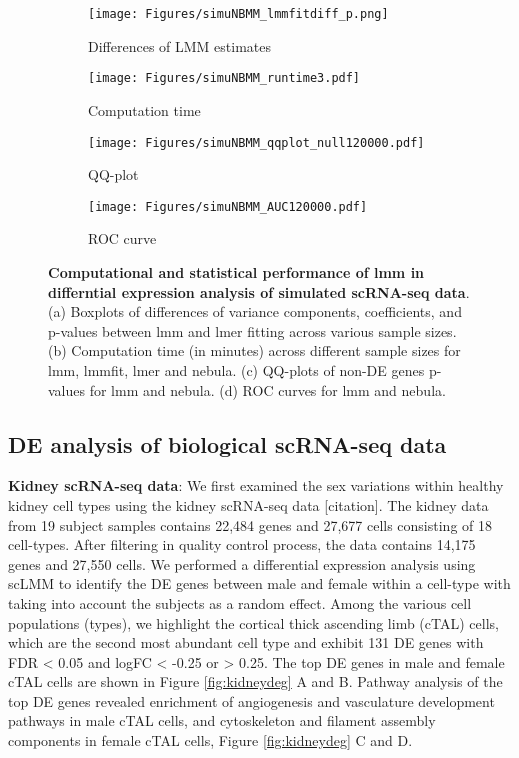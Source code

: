 \documentclass[
]{article}
\begin{document}
\begin{figure}[htb]
     \centering
     \begin{subfigure}[b]{0.45\textwidth}
         \centering
         \texttt{[image: Figures/simuNBMM\_lmmfitdiff\_p.png]}
         \caption{Differences of LMM estimates}
     \end{subfigure}
     \begin{subfigure}[b]{0.45\textwidth}
         \centering
         \texttt{[image: Figures/simuNBMM\_runtime3.pdf]}
         \caption{Computation time}
     \end{subfigure}
     \begin{subfigure}[b]{0.45\textwidth}
         \centering
         \texttt{[image: Figures/simuNBMM\_qqplot\_null120000.pdf]}
         \caption{QQ-plot}
     \end{subfigure}
     \begin{subfigure}[b]{0.45\textwidth}
         \centering
         \texttt{[image: Figures/simuNBMM\_AUC120000.pdf]}
         \caption{ROC curve}
     \end{subfigure}
     \centering
     \caption{\textbf{Computational and statistical performance of lmm in differntial expression analysis of simulated scRNA-seq data}. (a) Boxplots of differences of variance components, coefficients, and p-values between lmm and lmer fitting across various sample sizes. (b) Computation time (in minutes) across different sample sizes for lmm, lmmfit, lmer and nebula. (c) QQ-plots of non-DE genes p-values for lmm and nebula. (d) ROC curves for lmm and nebula.}
     \label{fig:lmer}
\end{figure}

\hypertarget{de-analysis-of-biological-scrna-seq-data}{%
\subsection{DE analysis of biological scRNA-seq
data}\label{de-analysis-of-biological-scrna-seq-data}}

\textbf{Kidney scRNA-seq data}: We first examined the sex variations
within healthy kidney cell types using the kidney scRNA-seq data
{[}citation{]}. The kidney data from 19 subject samples contains 22,484
genes and 27,677 cells consisting of 18 cell-types. After filtering in
quality control process, the data contains 14,175 genes and 27,550
cells. We performed a differential expression analysis using scLMM to
identify the DE genes between male and female within a cell-type with
taking into account the subjects as a random effect. Among the various
cell populations (types), we highlight the cortical thick ascending limb
(cTAL) cells, which are the second most abundant cell type and exhibit
131 DE genes with FDR \textless{} 0.05 and logFC \textless{} -0.25 or
\textgreater{} 0.25. The top DE genes in male and female cTAL cells are
shown in Figure \ref{fig:kidneydeg} A and B. Pathway analysis of the top
DE genes revealed enrichment of angiogenesis and vasculature development
pathways in male cTAL cells, and cytoskeleton and filament assembly
components in female cTAL cells, Figure \ref{fig:kidneydeg} C and D.
\end{document}
